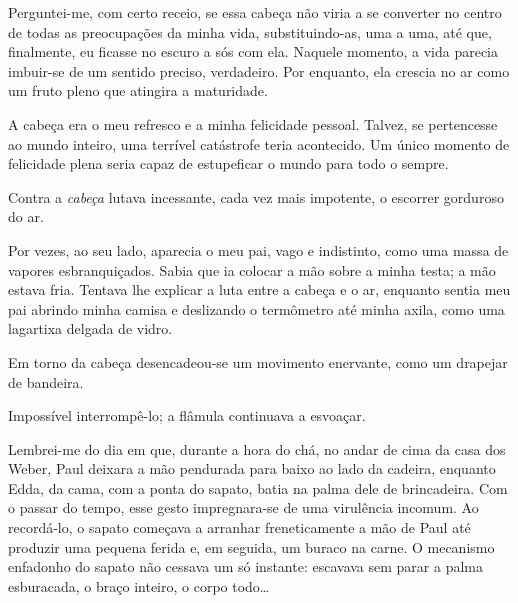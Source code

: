 


Perguntei-me, com certo receio, se essa cabeça não viria a se converter no
centro de todas as preocupações da minha vida, substituindo-as, uma a uma,
até que, finalmente, eu ficasse no escuro a sós com ela. Naquele momento, a
vida parecia imbuir-se de um sentido preciso, verdadeiro. Por enquanto, ela
crescia no ar como um fruto pleno que atingira a maturidade.

A cabeça era o meu refresco e a minha felicidade pessoal. Talvez, se
pertencesse ao mundo inteiro, uma terrível catástrofe teria acontecido. Um
único momento de felicidade plena seria capaz de estupeficar o mundo para
todo o sempre.

Contra a \textit{cabeça} lutava incessante, cada vez mais impotente, o
escorrer gorduroso do ar.

Por vezes, ao seu lado, aparecia o meu pai, vago e indistinto, como uma massa
de vapores esbranquiçados. Sabia que ia colocar a mão sobre a minha testa; a
mão estava fria. Tentava lhe explicar a luta entre a cabeça e o ar, enquanto
sentia meu pai abrindo minha camisa e deslizando o termômetro até minha
axila, como uma lagartixa delgada de vidro.

Em torno da cabeça desencadeou-se um movimento enervante, como um drapejar de
bandeira.

Impossível interrompê-lo; a flâmula continuava a esvoaçar.

Lembrei-me do dia em que, durante a hora do chá, no andar de cima da casa dos
Weber, Paul deixara a mão pendurada para baixo ao lado da cadeira, enquanto
Edda, da cama, com a ponta do sapato, batia na palma dele de brincadeira. Com
o passar do tempo, esse gesto impregnara-se de uma virulência incomum. Ao
recordá-lo, o sapato começava a arranhar freneticamente a mão de Paul até
produzir uma pequena ferida e, em seguida, um buraco na carne. O mecanismo
enfadonho do sapato não cessava um só instante: escavava sem parar a palma
esburacada, o braço inteiro, o corpo todo\ldots{}

